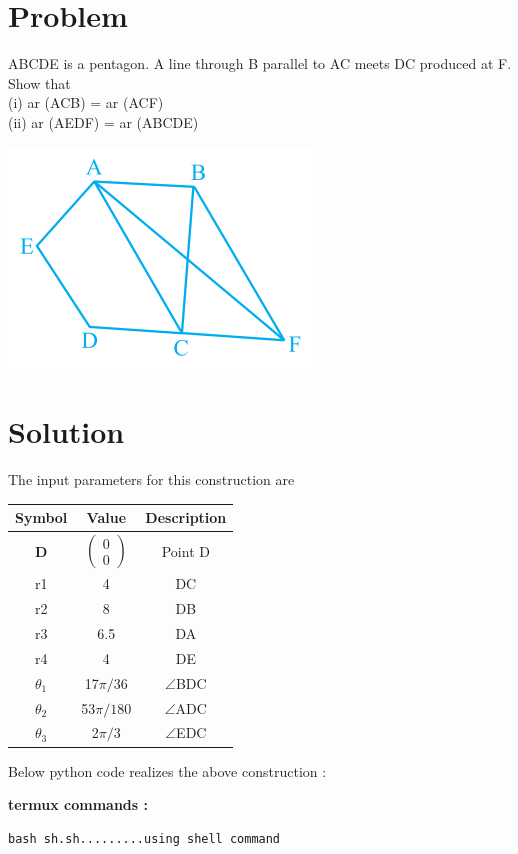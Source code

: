 \documentclass[10pt, a4paper]{article}
\title{\mytitle}
\author{\myauthor\hspace{1em}\\\contact\\FWC22034\hspace{6.5em}IITH\hspace{0.5em}\mymodule\hspace{6em}Assignment}
\newcommand{\myvec}[1]{\ensuremath{\begin{pmatrix}#1\end{pmatrix}}}
\let\vec\mathbf
\begin{document}
	\maketitle
	\tableofcontents
   \section{Problem}
   ABCDE is a pentagon. A line through
B parallel to AC meets DC produced at F. Show
that \\
(i) ar (ACB) = ar (ACF) \\       
(ii) ar (AEDF) = ar (ABCDE)

	    \includegraphics[scale=1.0]{diag_1.png}
   \section{Solution}
The input parameters for this construction are 
\begin{center}
\begin{tabular}{|c|c|c|}
	\hline
	\textbf{Symbol}&\textbf{Value}&\textbf{Description}\\
	\hline
	$\vec{D}$ & $\myvec{0\\0}$ & Point D\\
	\hline
	r1&4&DC\\
	\hline
	r2&8&DB\\
	\hline
	r3&6.5&DA\\
	\hline
	r4&4&DE\\
	\hline
	${\theta}_1$& 17$\pi/36$&$ \angle $BDC\\ 
	\hline
	${\theta}_2$& 53$\pi/180$&$ \angle $ADC\\ 
	\hline
	${\theta}_3$& 2$\pi/3$&$ \angle $EDC\\ 
	\hline
\end{tabular}
\end{center}
\begin{center}
Below python code realizes the above construction :
\end{center}
\textbf{termux commands :}
\begin{lstlisting}
bash sh.sh.........using shell command
\end{lstlisting}
\end{document}
